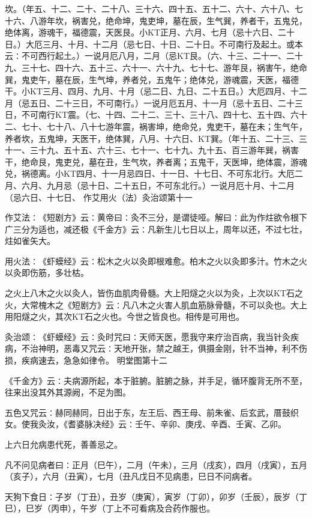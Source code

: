 \documentclass[a4paper,12pt,UTF8,twoside]{ctexbook}
\begin{document}
坎。（年五、十二、二十、二十八、三十六、四十五、五十二、六十、六十八、七十六、八游年坎，祸害兑，绝命坤，鬼吏坤，墓在辰，生气巽，养者干，五鬼兑，绝体离，游魂干，福德震，天医艮。小KT正月、六月、七月（忌十六日、二十日。）大厄三月、十月、十二月（忌七日、十日、二十日。不可南行及起土。或本云∶不可西行起土。）一说月厄八月，二月（忌KT艮。（六、十三、二十一、二十九、三十七、四十六、五十三、六十一、六十九、七十七、游年艮，祸害午，绝命巽，鬼吏午，墓在辰，生气坤，养者兑，五鬼午；绝体兑，游魂震，天医，福德干。小KT三月、四月、九月、十月（忌二日、九日、二十五日。）大厄四月、十二月（忌五日、二十三日，不可南行。）一说月厄五月、十一月（忌十五日、二十三日，不可南行KT震。（七、十四、二十二、三十、三十八、四十七、五十四、六十二、七十、七十八、八十七游年震，祸害坤，绝命兑，鬼吏干，墓在未；生气午，养者坎，五鬼坤，天医干，绝体巽，八月、十六日、KT巽。（年十五、二十三、三十一、三十九、五十五、六十三、七十一、七十九、九十五、百三游年巽，祸害干，绝命艮，鬼吏兑，墓在丑，生气坎，养者离；五鬼干，天医坤，绝体震，游魂兑，祸德离。小KT四月、十一月忌四日、十一日、十七日、不可东北行。大厄二月、六月、九月忌（忌十日、二十五日，不可东北行。）一说月厄十月、十二月（忌六日、十七日、
作艾用火（法）灸治颂第十一

作艾法∶《短剧方》云∶黄帝曰∶灸不三分，是谓徒哑。解曰∶此为作炷欲令根下广三分为适也，减还极《千金方》云∶凡新生儿七日以上，周年以还，不过七壮，炷如雀矢大。

用火法∶《虾蟆经》云∶松木之火以灸即根难愈。柏木之火以灸即多汁。竹木之火以灸即伤筋，多壮枯。

之火上八木之火以灸人，皆伤血肌肉骨髓。大上阳燧之火以为灸，上次以KT石之火，大常槐木之《短剧方》云∶凡八木之火害人肌血筋脉骨髓，不可以灸也。大上用阳燧之火，其次KT石之火也。今世之皆良也。相传是可用也。

灸治颂∶《虾蟆经》云∶灸时咒曰∶天师天医，愿我守来疗治百病，我当针灸疾病，不治神明，恶毒又咒云∶天地开张，禁之越王，俱摄金刚，针不当神，利不伤损，疾病速去，急急如律令。
明堂图第十二

《千金方》云∶夫病源所起，本于脏腑。脏腑之脉，并手足，循环腹背无所不至，往来出没其外其源阙，不足为图。

五色又咒云∶赫同赫同，日出于东，左王后、西王母、前朱雀、后玄武，厝鼓织女。使我灸汝，《耆婆脉决经》云∶壬午、辛卯、庚戌、辛酉、壬寅、乙卯。

上六日允病患代死，善善忌之。

凡不问见病者曰∶正月（巳午），二月（午未），三月（戌亥），四月（戌寅），五月（亥子），六月（丑寅），七月（丑凡戊日不见病患，巳日不问病者。

天狗下食日∶子岁（丁丑），丑岁（庚寅），寅岁（丁卯），卯岁（壬辰），辰岁（丁巳），巳岁（丙申），午岁（丁上不可看病及合药作服也。
\end{document}
